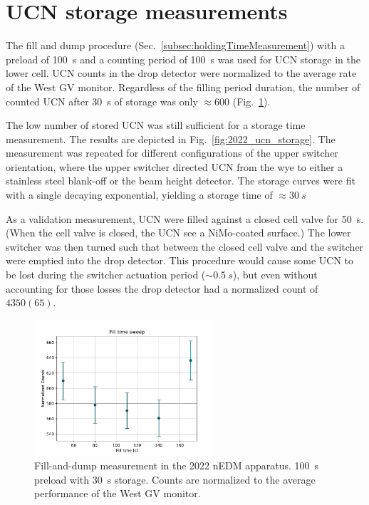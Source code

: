 
\section{UCN storage measurements}\label{sec:2022_ucn_storage_measurements}


The fill and dump procedure (Sec.~\ref{subsec:holdingTimeMeasurement}) with a preload of \qty{100}{s} and a counting period of \qty{100}{s} was used for UCN storage in the lower cell. UCN counts in the drop detector were normalized to the average rate of the West GV monitor. Regardless of the filling period duration, the number of counted UCN after \qty{30}{s} of storage was only $\approx 600$ (Fig.~\ref{fig:2022_fill_time_sweep}).

The low number of stored UCN was still sufficient for a storage time measurement. The results are depicted in Fig.~\ref{fig:2022_ucn_storage}. The measurement was repeated for different configurations of the upper switcher orientation, where the upper switcher directed UCN from the wye to either a stainless steel blank-off or the beam height detector. The storage curves were fit with a single decaying exponential, yielding a storage time of $\approx \qty{30}{s}$

As a validation measurement, UCN were filled against a closed cell valve for \qty{50}{s}. (When the cell valve is closed, the UCN see a NiMo-coated surface.) The lower switcher was then turned such that \ucn between the closed cell valve and the switcher were emptied into the drop detector. This procedure would cause some UCN to be lost during the switcher actuation period ($\sim \qty{0.5}{s}$), but even without accounting for those losses the drop detector had a normalized count of $4350(65)$.

 \begin{figure}
    \centering
    \includegraphics[width=0.6\textwidth]{figures/2022_fill_sweep.pdf}
    \caption
     {Fill-and-dump measurement in the 2022 nEDM apparatus. \qty{100}{s} preload with \qty{30}{s} storage. Counts are normalized to the average performance of the West GV monitor.}
    \label{fig:2022_fill_time_sweep}
\end{figure}


